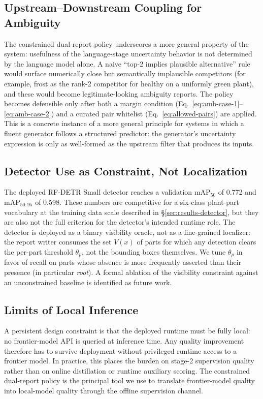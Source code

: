 \subsection{Upstream--Downstream Coupling for Ambiguity}

The constrained dual-report policy underscores a more general property
of the system: usefulness of the language-stage uncertainty behavior is
not determined by the language model alone. A naive ``top-2 implies
plausible alternative'' rule would surface numerically close but
semantically implausible competitors (for example, frost as the rank-2
competitor for healthy on a uniformly green plant), and these would
become legitimate-looking ambiguity reports. The policy becomes
defensible only after both a margin condition
(Eq.~\ref{eq:amb-case-1}--\ref{eq:amb-case-2}) and a curated pair
whitelist (Eq.~\ref{eq:allowed-pairs}) are applied. This is a concrete
instance of a more general principle for systems in which a fluent
generator follows a structured predictor: the generator's uncertainty
expression is only as well-formed as the upstream filter that produces
its inputs.

\subsection{Detector Use as Constraint, Not Localization}

The deployed RF-DETR Small detector reaches a validation
$\mathrm{mAP}_{50}$ of 0.772 and $\mathrm{mAP}_{50:95}$ of 0.598. These
numbers are competitive for a six-class plant-part vocabulary at the
training data scale described in \S\ref{sec:results-detector}, but they
are also not the full criterion for the detector's intended runtime
role. The detector is deployed as a binary visibility oracle, not as a
fine-grained localizer: the report writer consumes the set $V(x)$ of
parts for which any detection clears the per-part threshold $\theta_p$,
not the bounding boxes themselves. We tune $\theta_p$ in favor of recall
on parts whose absence is more frequently asserted than their presence
(in particular \emph{root}). A formal ablation of the visibility
constraint against an unconstrained baseline is identified as future
work.

\subsection{Limits of Local Inference}

A persistent design constraint is that the deployed runtime must be
fully local: no frontier-model API is queried at inference time. Any
quality improvement therefore has to survive deployment without
privileged runtime access to a frontier model. In practice, this places
the burden on stage-2 supervision quality rather than on online
distillation or runtime auxiliary scoring. The constrained dual-report
policy is the principal tool we use to translate frontier-model quality
into local-model quality through the offline supervision channel.

